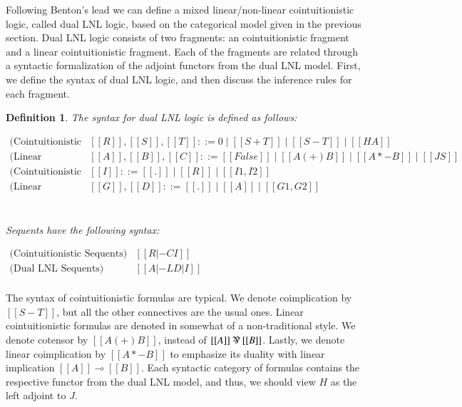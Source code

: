 \documentclass{lmcs}
\newtheorem{definition}[theorem]{Definition}
\newcommand{\limp}[0]{\multimap}
\begin{document}
Following Benton's \cite{Benton:1994} lead we can define a mixed
linear/non-linear cointuitionistic logic, called dual LNL logic, based
on the categorical model given in the previous section.  Dual LNL
logic consists of two fragments: an cointuitionistic fragment and a
linear cointuitionistic fragment.  Each of the fragments are related
through a syntactic formalization of the adjoint functors from the
dual LNL model.  First, we define the syntax of dual LNL logic, and
then discuss the inference rules for each fragment.
\begin{definition}
  \label{def:DualLNL-syntax}
  The syntax for dual LNL logic is defined as follows:
  \begin{center}
    \begin{math}
      \begin{array}{rlllllllllll}        
        \text{(Cointuitionistic Formulas)} &  [[R]], [[S]], [[T]] ::= 0 \mid [[S + T]] \mid [[S - T]] \mid [[H A]]\\
        \text{(Linear Cointuitionistic Formulas)} &
             [[A]],[[B]],[[C]] ::= [[False]] \mid [[A (+) B]] \mid [[A *- B]] \mid [[J S]]\\        
        \text{(Cointuitionistic Contexts)}  & [[I]] ::= [[.]] \mid
             [[R]] \mid [[I1 , I2]]\\
        \text{(Linear Cointuitionistic Contexts)}  &
             [[G]],[[D]] ::= [[.]] \mid [[A]] \mid [[G1,G2]]\\        
      \end{array}
    \end{math}
  \end{center}
  \ \\
  \noindent
  Sequents have the following syntax:
  \begin{center}
    \begin{math}
      \begin{array}{rll}
        \text{(Cointuitionistic Sequents)} & [[R |-C I]]\\
        \text{(Dual LNL Sequents)} & [[A |-L D | I]]\\
      \end{array}
    \end{math}
  \end{center}
\end{definition}

The syntax of cointuitionistic formulas are typical.  We denote
coimplication by $[[S - T]]$, but all the other connectives are the
usual ones. Linear cointuitionistic formulas are denoted in somewhat
of a non-traditional style. We denote cotensor by $[[A (+) B]]$,
instead of $[[A]] \parr [[B]]$.  Lastly, we denote linear
coimplication by $[[A *- B]]$ to emphasize its duality with linear
implication $[[A]] \limp [[B]]$.  Each syntactic category of formulas
contains the respective functor from the dual LNL model, and thus, we
should view $H$ as the left adjoint to $J$.
\end{document}
